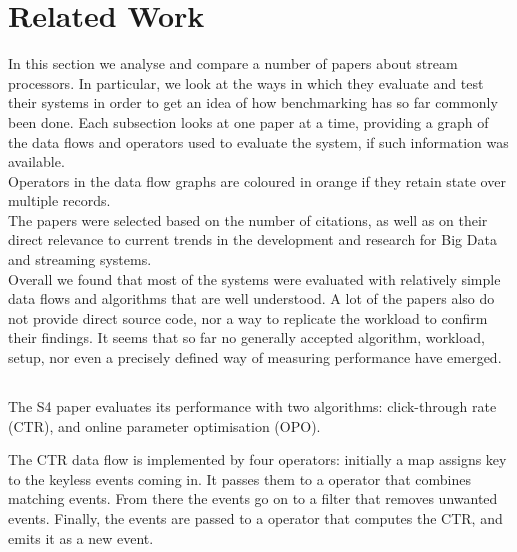 \section{Related Work}
In this section we analyse and compare a number of papers about stream processors. In particular, we look at the ways in which they evaluate and test their systems in order to get an idea of how benchmarking has so far commonly been done. Each subsection looks at one paper at a time, providing a graph of the data flows and operators used to evaluate the system, if such information was available. \\

Operators in the data flow graphs are coloured in orange if they retain state over multiple records. \\

The papers were selected based on the number of citations, as well as on their direct relevance to current trends in the development and research for Big Data and streaming systems. \\

Overall we found that most of the systems were evaluated with relatively simple data flows and algorithms that are well understood. A lot of the papers also do not provide direct source code, nor a way to replicate the workload to confirm their findings. It seems that so far no generally accepted algorithm, workload, setup, nor even a precisely defined way of measuring performance have emerged.

\subsection{}
The S4 paper\cite{s4} evaluates its performance with two algorithms: click-through rate (CTR), and online parameter optimisation (OPO). \\


The CTR data flow is implemented by four operators: initially a map assigns key to the keyless events coming in. It passes them to a operator that combines matching events. From there the events go on to a filter that removes unwanted events. Finally, the events are passed to a operator that computes the CTR, and emits it as a new event. \\

